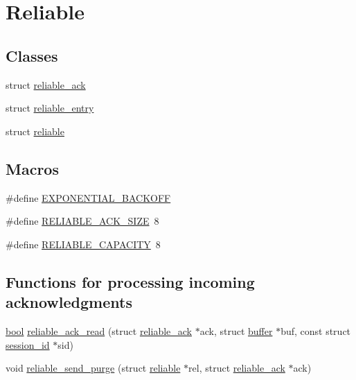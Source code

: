 \hypertarget{group__reliable}{}\section{Reliable}
\label{group__reliable}
\subsection*{Classes}
\begin{DoxyCompactItemize}
\item 
struct \hyperlink{structreliable__ack}{reliable\+\_\+ack}
\item 
struct \hyperlink{structreliable__entry}{reliable\+\_\+entry}
\item 
struct \hyperlink{structreliable}{reliable}
\end{DoxyCompactItemize}
\subsection*{Macros}
\begin{DoxyCompactItemize}
\item 
\#define \hyperlink{group__reliable_gacb891f0bfc023839a53a2c7005cd340c}{E\+X\+P\+O\+N\+E\+N\+T\+I\+A\+L\+\_\+\+B\+A\+C\+K\+O\+F\+F}
\item 
\#define \hyperlink{group__reliable_ga91ccbc389e490d03321b1a6de0dd096d}{R\+E\+L\+I\+A\+B\+L\+E\+\_\+\+A\+C\+K\+\_\+\+S\+I\+Z\+E}~8
\item 
\#define \hyperlink{group__reliable_gaa626a13dc31bf131a92548b9b2810cba}{R\+E\+L\+I\+A\+B\+L\+E\+\_\+\+C\+A\+P\+A\+C\+I\+T\+Y}~8
\end{DoxyCompactItemize}
\subsection*{Functions for processing incoming acknowledgments}
\begin{DoxyCompactItemize}
\item 
\hyperlink{automatic_8c_abb452686968e48b67397da5f97445f5b}{bool} \hyperlink{group__reliable_ga03d3c93ec4c15d57947740a56eae0aec}{reliable\+\_\+ack\+\_\+read} (struct \hyperlink{structreliable__ack}{reliable\+\_\+ack} $\ast$ack, struct \hyperlink{structbuffer}{buffer} $\ast$buf, const struct \hyperlink{structsession__id}{session\+\_\+id} $\ast$sid)
\item 
void \hyperlink{group__reliable_ga0f79fac5e64e7d2a9df9bc13740f6293}{reliable\+\_\+send\+\_\+purge} (struct \hyperlink{structreliable}{reliable} $\ast$rel, struct \hyperlink{structreliable__ack}{reliable\+\_\+ack} $\ast$ack)
\end{DoxyCompactItemize}
